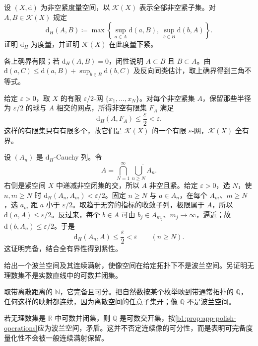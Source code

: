 \begin{exercise}\label{b1:ex:A1-hyperspace}
设 \((X,\mathrm{d})\) 为非空紧度量空间，以 \(\mathcal K(X)\) 表示全部非空紧子集。对 \(A,B\in\mathcal K(X)\) 规定
\[
 \mathrm{d}_H(A,B)\coloneqq\max\left\{\sup_{a\in A}\mathrm{d}(a,B),\ \sup_{b\in B}\mathrm{d}(b,A)\right\}.
\]
证明 \(\mathrm{d}_H\) 为度量，并证明 \(\mathcal K(X)\) 在此度量下紧。
\end{exercise}
\begin{solution}
各上确界有限；若 \(\mathrm{d}_H(A,B)=0\)，闭性说明 \(A\subset B\) 且 \(B\subset A\)。由
\(\mathrm{d}(a,C)\le \mathrm{d}(a,B)+\sup_{b\in B}\mathrm{d}(b,C)\)
及反向同类估计，取上确界得到三角不等式。

给定 \(\varepsilon>0\)，取 \(X\) 的有限 \(\varepsilon/2\)-网 \(\{x_1,\ldots,x_N\}\)。对每个非空紧集 \(A\)，保留那些半径为 \(\varepsilon/2\) 的球与 \(A\) 相交的网点，所得非空有限集 \(F_A\) 满足
\[
 \mathrm{d}_H(A,F_A)\le \frac{\varepsilon}{2}<\varepsilon.
\]
这样的有限集只有有限多个，故它们是 \(\mathcal K(X)\) 的一个有限 \(\varepsilon\)-网，\(\mathcal K(X)\) 全有界。

设 \((A_n)\) 是 \(\mathrm{d}_H\)-Cauchy 列。令
\[
 A=\bigcap_{N=1}^{\infty}\overline{\bigcup_{n\ge N}A_n}.
\]
右侧是紧空间 \(X\) 中递减非空闭集的交，所以 \(A\) 非空且紧。给定 \(\varepsilon>0\)，选 \(N\)，使 \(n,m\ge N\) 时 \(\mathrm{d}_H(A_n,A_m)<\varepsilon/2\)。固定 \(n\ge N\) 与 \(a\in A_n\)，在每个 \(A_m\)、\(m\ge N\)，选 \(a_m\) 距 \(a\) 小于 \(\varepsilon/2\)。取趋于无穷的指标的收敛子列，极限属于 \(A\)，所以 \(\mathrm{d}(a,A)\le\varepsilon/2\)。反过来，每个 \(b\in A\) 可由 \(b_j\in A_{m_j}\)、\(m_j\to\infty\)，逼近；故 \(\mathrm{d}(b,A_n)\le\varepsilon/2\)。于是
\[
 \mathrm{d}_H(A_n,A)\le\frac{\varepsilon}{2}<\varepsilon
 \qquad(n\ge N).
\]
这证明完备，结合全有界性得到紧性。
\end{solution}

\begin{exercise}\label{b1:ex:A1-polish-image}
给出一个波兰空间及其连续满射，使像空间在给定拓扑下不是波兰空间。另证明无理数集不是实数直线中的可数并闭集。
\end{exercise}
\begin{solution}
取带离散距离的 \(\mathbb N\)，它完备且可分。把自然数按某个枚举映到带通常拓扑的 \(\mathbb Q\)，任何这样的映射都连续，因为离散空间的任意子集开；像 \(\mathbb Q\) 不是波兰空间。

若无理数集是 \(\mathbb R\) 中可数并闭集，则 \(\mathbb Q\) 是可数交开集，按\cref{b1:prop:app-polish-operations}应为波兰空间，矛盾。这并不否定连续像的可分性，而是表明可完备度量化性不会被一般连续满射保留。
\end{solution}


